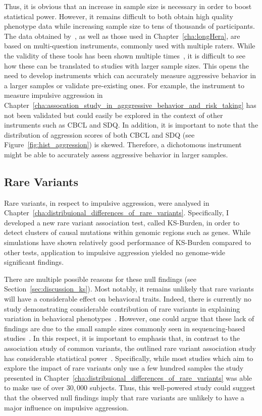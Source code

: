 Thus, it is obvious that an increase in sample size is necessary in order to boost statistical power.
However, it remains difficult to both obtain high quality phenotype data while increasing sample size to tens of thousands of participants.
The data obtained by~\citet{Pappa2016a}, as well as those used in Chapter~\ref{cha:longHera}, are based on multi-question instruments, commonly used with multiple raters.
While the validity of these tools has been shown multiple times~\cite{Goodman1997,Goodman2001,Achenbach2003}, it is difficult to see how these can be translated to studies with larger sample sizes.
This opens the need to develop instruments which can accurately measure aggressive behavior in a larger samples or validate pre-existing ones.  
For example, the  instrument to measure impulsive aggression in Chapter~\ref{cha:assocation_study_in_agggressive_behavior_and_risk_taking} has not been validated but could easily be explored in the context of other instruments such as CBCL and SDQ\@.
In addition, it is important to note that the distribution of aggression scores of both CBCL and SDQ (see Figure~\ref{fig:hist_aggression}) is skewed.
Therefore, a dichotomous instrument might be able to accurately assess aggressive behavior in larger samples. 

\subsection{Rare Variants}
\label{sub:rare_variants_disccusion}

Rare variants, in respect to impulsive aggression, were analysed in Chapter~\ref{cha:distribuional_differences_of_rare_variants}.
Specifically, I developed a new rare variant association test, called KS-Burden, in order to detect clusters of causal mutations within genomic regions such as genes.
While simulations have shown relatively good performance of KS-Burden compared to other tests, application to impulsive aggression yielded no genome-wide significant findings. 

There are multiple possible reasons for these null findings (see Section~\ref{sec:discussion_ks}).
Most notably, it remains unlikely that rare variants will have a considerable effect on behavioral traits.
Indeed, there is currently no study demonstrating considerable contribution of rare variants in explaining variation in behavioral phenotypes~\cite{Chabris2015}.
However, one could argue that these lack of findings are due to the small sample sizes commonly seen in sequencing-based studies~\cite{Lee2014}. 
In this respect, it is important to emphasis that, in contrast to the association study of common variants, the outlined rare variant association study has considerable statistical power~\cite{Lee2011}.
Specifically, while most studies which aim to explore the impact of rare variants only use a few hundred samples the study presented in Chapter~\ref{cha:distribuional_differences_of_rare_variants} was able to make use of over $30,000$ subjects. 
Thus, this well-powered study could suggest that the observed  null findings imply that rare variants are unlikely to have a major influence on impulsive aggression.

